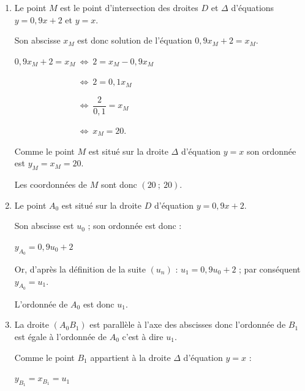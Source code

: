 \begin{corrige}
     \par
     \begin{enumerate}
          \item %
          Le point $M$ est le point d'intersection des droites $D$ et $\Delta$ d'équations $y=0,9x+2$ et $y=x$.
          \par
          Son abscisse $x_M$ est donc solution de l'équation $0,9x_M+2 = x_M$.
          \par
          $0,9x_M+2 = x_M\ \Leftrightarrow \ 2=x_M-0,9x_M$
          \par
          $\phantom{0,9x_M+2 = x_M}\ \Leftrightarrow \ 2=0,1x_M$
          \par
          $\phantom{0,9x_M+2 = x_M}\ \Leftrightarrow \ \dfrac{2}{0,1}=x_M$
          \par
          $\phantom{0,9x_M+2 = x_M}\ \Leftrightarrow \ x_M=20$.
          \par
          Comme le point $M$ est situé sur la droite $\Delta$ d'équation $y=x$ son ordonnée est $y_M=x_M=20$.
          \par
          Les coordonnées de $M$ sont donc $(20~;~20)$.
          \item %
          Le point $A_0$ est situé sur la droite $D$ d'équation $y=0,9x+2$.
          \par
          Son abscisse est $u_0$ ; son ordonnée est donc :
          \par
          $y_{A_0}=0,9u_0+2$
          \par
          Or, d'après la définition de la suite $(u_n)$ : $u_1=0,9u_0+2$ ; par conséquent $y_{A_0}=u_1$.
          \par
          L'ordonnée de $A_0$ est donc $u_1$.
          \item %
          La droite $(A_0B_1)$ est parallèle à l'axe des abscisses donc l'ordonnée de $B_1$ est égale à l'ordonnée de $A_0$ c'est à dire $u_1$.
          \par
          Comme le point $B_1$ appartient à la droite $\Delta$ d'équation $y=x$ :
          \par
          $y_{B_1}=x_{B_1}=u_1$
          \par

\end{enumerate}
\end{corrige}
